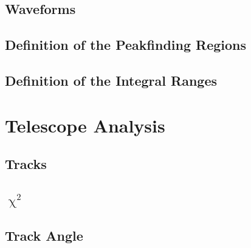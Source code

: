 \documentclass[9pt]{beamer}
\begin{document}
\subsection{Waveforms}
\begin{frame}
\end{frame}
\subsection{Definition of the Peakfinding Regions}
\begin{frame}
\end{frame}
\subsection{Definition of the Integral Ranges}
\begin{frame}
\end{frame}
\section{Telescope Analysis}
\subsection{Tracks}
\begin{frame}
\end{frame}
\subsection{$\upchi^{2}$}
\begin{frame}
\end{frame}
\subsection{Track Angle}
\begin{frame}
\end{frame}
\end{document}

